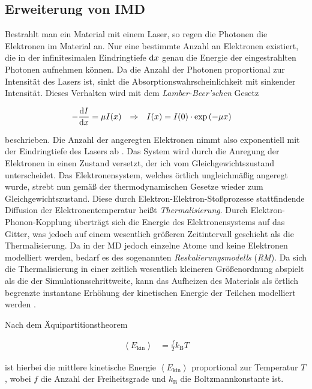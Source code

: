 	\subsection{Erweiterung von IMD} %
		Bestrahlt man ein Material mit einem Laser, so regen die Photonen die Elektronen im
		Material an. Nur eine bestimmte Anzahl an Elektronen existiert, die in der infinitesimalen
		Eindringtiefe $\dx$ genau die Energie der eingestrahlten Photonen aufnehmen können. Da die
		Anzahl der Photonen proportional zur Intensität des Lasers ist, sinkt die
		Absorptionswahrscheinlichkeit mit sinkender Intensität. Dieses Verhalten wird mit dem
		\emph{Lamber-Beer'schen} Gesetz

		\begin{align}
			-\frac{\dx[I]}{\dx[x]} &= \mu I(x)
			&\Rightarrow&&
			I(x) &= I(0) \cdot \exp\left(-\mu x\right)
		\end{align}

		beschrieben. Die Anzahl der angeregten Elektronen nimmt also exponentiell mit der
		Eindringtiefe des Lasers ab \cite{klein2013klassische}. Das System wird durch die Anregung
		der Elektronen in einen Zustand versetzt, der ich vom Gleichgewichtszustand unterscheidet.
		Das Elektronensystem, welches örtlich ungleichmäßig angeregt wurde, strebt nun gemäß der
		thermodynamischen Gesetze wieder zum Gleichgewichtszustand. Diese durch
		Elektron-Elektron-Stoßprozesse stattfindende Diffusion der Elektronentemperatur heißt
		\emph{Thermalisierung}. Durch Elektron-Phonon-Kopplung überträgt sich die Energie des
		Elektronensystems auf das Gitter, was jedoch auf einem wesentlich größeren Zeitintervall
		geschieht als die Thermalisierung. Da in der MD jedoch einzelne Atome und keine Elektronen
		modelliert werden, bedarf es des sogenannten \emph{Reskalierungsmodells} (\emph{RM}).
		Da sich die Thermalisierung in einer zeitlich wesentlich kleineren Größenordnung abspielt
		als die der Simulationsschrittweite, kann das Aufheizen des Materials als örtlich begrenzte
		instantane Erhöhung der kinetischen Energie der Teilchen modelliert werden
		\cite{klein2013klassische}.

		Nach dem Äquipartitionstheorem

		\begin{align}
			\left\langle E_\text{kin} \right\rangle &= \frac{f}{2} k_\text{B} T
				\label{eq:equipartition}
		\end{align}

		ist hierbei die mittlere kinetische Energie $\left\langle E_\text{kin} \right\rangle$
		proportional zur Temperatur $T$, wobei $f$ die Anzahl der Freiheitsgrade und
		$k_\text{B}$ die Boltzmannkonstante ist.


